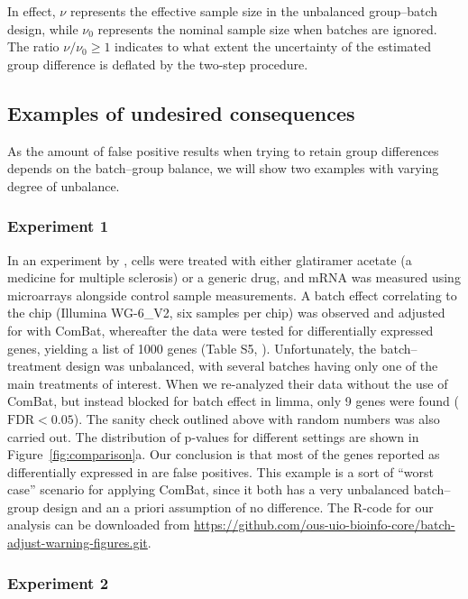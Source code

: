 \documentclass{bio}
\begin{document}
In effect, $\nu$ represents the effective sample size in the unbalanced group--batch design, while $\nu_0$ represents the nominal sample size when batches are ignored. The ratio $\nu/\nu_0\ge1$ indicates to what extent the uncertainty of the estimated group difference is deflated by the two-step procedure.


\subsection{Examples of undesired consequences}

As the amount of false positive results when trying to retain group differences depends on the batch--group balance, we will show two examples with varying degree of unbalance. 

\subsubsection{Experiment 1}

In an experiment by \citet{Towfic2014}, cells were treated with either glatiramer acetate (a medicine for multiple sclerosis) or a generic drug, and mRNA was measured using microarrays alongside control sample measurements. A batch effect correlating to the chip (Illumina WG-6\_V2, six samples per chip) was observed and adjusted for with ComBat, whereafter the data were tested for differentially expressed genes, yielding a list of 1000 genes (Table S5, \citealp{Towfic2014}). Unfortunately, the batch--treatment design was unbalanced, with several batches having only one of the main treatments of interest. When we re-analyzed their data without the use of ComBat, but instead blocked for batch effect in limma, only 9 genes were found ($\text{FDR}<0.05$). The sanity check  outlined above with random numbers was also carried out. The distribution of p-values for different settings are shown in Figure~\ref{fig:comparison}a.  Our conclusion is that most of the genes reported as differentially expressed in \citet{Towfic2014} are false positives. This example is a sort of ``worst case'' scenario for applying ComBat, since it both has a very unbalanced batch--group design and an a priori assumption of no difference. The R-code for our analysis can be downloaded from \href{https://github.com/ous-uio-bioinfo-core/batch-adjust-warning-figures.git}{https://github.com/ous-uio-bioinfo-core/batch-adjust-warning-figures.git}.

\subsubsection{Experiment 2}
\end{document}

